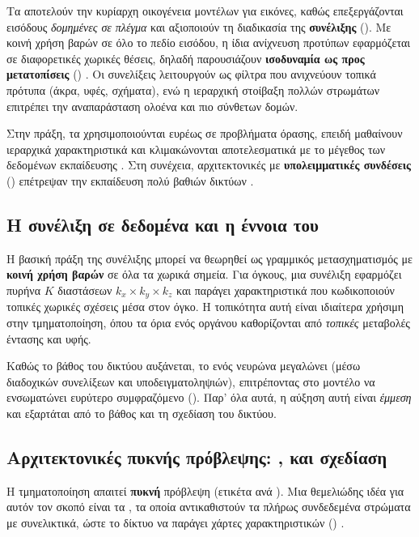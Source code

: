 Τα  αποτελούν την κυρίαρχη οικογένεια μοντέλων για εικόνες, καθώς επεξεργάζονται εισόδους \textit{δομημένες σε πλέγμα} και αξιοποιούν τη διαδικασία της \textbf{συνέλιξης} (). 
Με κοινή χρήση βαρών σε όλο το πεδίο εισόδου, η ίδια ανίχνευση προτύπων εφαρμόζεται σε διαφορετικές χωρικές θέσεις,
δηλαδή παρουσιάζουν \textbf{ισοδυναμία ως προς μετατοπίσεις} () \cite{aggarwal2018neural}.
Οι συνελίξεις λειτουργούν
ως φίλτρα που ανιχνεύουν τοπικά πρότυπα (άκρα, υφές, σχήματα), ενώ η ιεραρχική στοίβαξη πολλών στρωμάτων επιτρέπει την
αναπαράσταση ολοένα και πιο σύνθετων δομών.

Στην πράξη, τα  χρησιμοποιούνται ευρέως σε προβλήματα όρασης, επειδή μαθαίνουν ιεραρχικά χαρακτηριστικά και κλιμακώνονται αποτελεσματικά με το μέγεθος των δεδομένων εκπαίδευσης \cite{krizhevsky2012imagenet}.
Στη συνέχεια, αρχιτεκτονικές με
\textbf{υπολειμματικές συνδέσεις} () επέτρεψαν την εκπαίδευση πολύ βαθιών δικτύων
\cite{he2016resnet}.

\subsection{Η συνέλιξη σε  δεδομένα και η έννοια του }

Η βασική πράξη της συνέλιξης μπορεί να θεωρηθεί ως γραμμικός μετασχηματισμός με \textbf{κοινή χρήση βαρών} σε όλα τα χωρικά
σημεία. Για  όγκους, μια  συνέλιξη εφαρμόζει πυρήνα $K$ διαστάσεων $k_x\times k_y\times k_z$ και παράγει
χαρακτηριστικά που κωδικοποιούν τοπικές χωρικές σχέσεις μέσα στον όγκο. Η τοπικότητα αυτή είναι ιδιαίτερα χρήσιμη στην
τμηματοποίηση, όπου τα όρια ενός οργάνου καθορίζονται από \textit{τοπικές} μεταβολές έντασης και υφής.

Καθώς το βάθος του δικτύου αυξάνεται, το \textbf{} ενός νευρώνα μεγαλώνει (μέσω διαδοχικών συνελίξεων και
υποδειγματοληψιών), επιτρέποντας στο μοντέλο να ενσωματώνει ευρύτερο συμφραζόμενο (). Παρ’ όλα αυτά, η αύξηση αυτή είναι
\textit{έμμεση} και εξαρτάται από το βάθος και τη σχεδίαση του δικτύου.

\subsection{Αρχιτεκτονικές πυκνής πρόβλεψης: ,  και  σχεδίαση}
Η τμηματοποίηση απαιτεί \textbf{πυκνή} πρόβλεψη (ετικέτα ανά ). Μια θεμελιώδης ιδέα για αυτόν τον σκοπό
είναι τα , τα οποία αντικαθιστούν τα πλήρως συνδεδεμένα στρώματα με συνελικτικά,
ώστε το δίκτυο να παράγει χάρτες χαρακτηριστικών () \cite{long2015fcn}.

